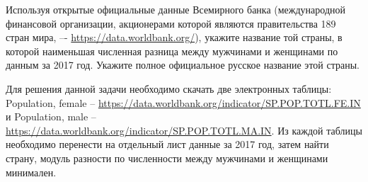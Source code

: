 
Используя открытые официальные данные Всемирного банка (международной финансовой организации, акционерами которой являются правительства 189 стран мира, –- \url{https://data.worldbank.org/}), укажите название той страны, в которой наименьшая численная разница между мужчинами и женщинами по данным за 2017 год. Укажите полное официальное русское название этой страны.

\solutionSection

Для решения данной задачи необходимо скачать две электронных таблицы: \linebreak Population, female -- \url{https://data.worldbank.org/indicator/SP.POP.TOTL.FE.IN} и Population, male  -- \url{https://data.worldbank.org/indicator/SP.POP.TOTL.MA.IN}.
Из каждой таблицы необходимо перенести на отдельный лист данные за 2017 год, затем найти страну, модуль разности по численности между мужчинами и женщинами минимален.

